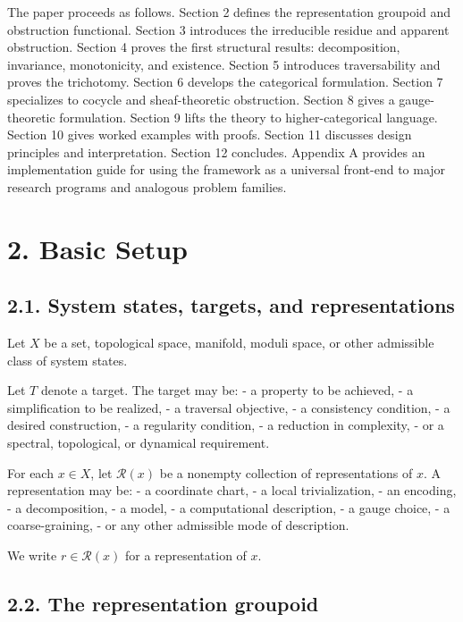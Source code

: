 \documentclass[
]{article}
\begin{document}
The paper proceeds as follows. Section 2 defines the representation
groupoid and obstruction functional. Section 3 introduces the
irreducible residue and apparent obstruction. Section 4 proves the first
structural results: decomposition, invariance, monotonicity, and
existence. Section 5 introduces traversability and proves the
trichotomy. Section 6 develops the categorical formulation. Section 7
specializes to cocycle and sheaf-theoretic obstruction. Section 8 gives
a gauge-theoretic formulation. Section 9 lifts the theory to
higher-categorical language. Section 10 gives worked examples with
proofs. Section 11 discusses design principles and interpretation.
Section 12 concludes. Appendix A provides an implementation guide for
using the framework as a universal front-end to major research programs
and analogous problem families.

\section{2. Basic Setup}\label{basic-setup}

\subsection{2.1. System states, targets, and
representations}\label{system-states-targets-and-representations}

Let \(X\) be a set, topological space, manifold, moduli space, or other
admissible class of system states.

Let \(T\) denote a target. The target may be: - a property to be
achieved, - a simplification to be realized, - a traversal objective, -
a consistency condition, - a desired construction, - a regularity
condition, - a reduction in complexity, - or a spectral, topological, or
dynamical requirement.

For each \(x \in X\), let \(\mathcal{R}(x)\) be a nonempty collection of
representations of \(x\). A representation may be: - a coordinate chart,
- a local trivialization, - an encoding, - a decomposition, - a model, -
a computational description, - a gauge choice, - a coarse-graining, - or
any other admissible mode of description.

We write \(r \in \mathcal{R}(x)\) for a representation of \(x\).

\subsection{2.2. The representation
groupoid}\label{the-representation-groupoid}
\end{document}

